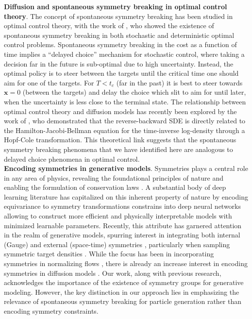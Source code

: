 \documentclass{article}
\newcommand{\vect}[1]{\boldsymbol{#1}}
\begin{document}
\textbf{Diffusion and spontaneous symmetry breaking in optimal control theory}. The concept of spontaneous symmetry breaking has been studied in optimal control theory, with the work of \citet{kappen2005path}, who showed the existence of spontaneous symmetry breaking in both stochastic and deterministic optimal control problems. Spontaneous symmetry breaking in the cost as a function of time implies a ``delayed choice'' mechanism for stochastic control, where taking a decision far in the future is sub-optimal due to high uncertainty. Instead, the optimal policy is to steer between the targets until the critical time one should aim for one of the targets. For $T < t_c$ (far in the past) it is best to steer towards $\vect{x}=0$ (between the targets) and delay the choice which slit to aim for until later, when the uncertainty is less close to the terminal state. The relationship between optimal control theory and diffusion models has recently been explored by the work of \citet{berner2022optimal}, who demonstrated that the reverse-backward SDE is directly related to the Hamilton-Jacobi-Bellman equation for the time-inverse log-density through a Hopf-Cole transformation. This theoretical link suggests that the spontaneous symmetry breaking phenomena that we have identified here are analogous to delayed choice phenomena in optimal control.\\ \textbf{Encoding symmetries in generative models}. Symmetries plays a central role in any area of physics, revealing the foundational principles of nature and enabling the formulation of conservation laws \citep{gross1996role, Noether_1971}. A substantial body of deep learning literature has capitalized on this inherent property of nature by encoding equivariance to symmetry transformations constrains into deep neural networks  \citep{cohen2016group, worrall2018cubenet, bogatskiy2020lorentz, cesa2021program, weiler2021coordinate} allowing to construct more efficient and physically interpretable models with minimized learnable parameters. Recently, this attribute has garnered attention in the realm of generative models, spurring interest in integrating both internal (Gauge) and external (space-time) symmetries \citep{PhysRevLett.125.121601}, particularly when sampling symmetric target densities \citep{kohler2020equivariant}. While the focus has been in incorporating symmetries in normalizing flows \citep{PhysRevD.103.074504, kohler2020equivariant, rezende2020normalizing, satorras2021n}, there is already an increase interest in encoding symmetries in diffusion models  \citet{xu2022geodiff, hoogeboom2022equivariant}. Our work, along with previous research, acknowledges the importance of the existence of symmetry groups for generative modeling. However, the key distinction in our approach lies in emphasizing the relevance of  spontaneous symmetry breaking for particle generation rather than encoding symmetry constraints.\\
\end{document}
